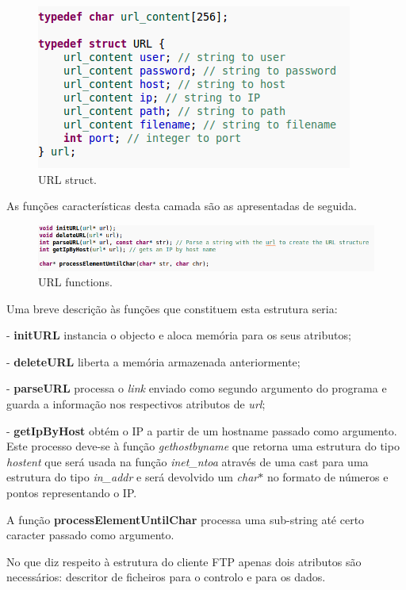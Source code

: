 \documentclass[a4paper]{article}
\begin{document}
\begin{figure}[h!]
\centering
\includegraphics[scale=0.5]{res/url-struct.png}
\caption{URL struct.}
\end{figure}

As funções características desta camada são as apresentadas de seguida.
\pagebreak

\begin{figure}[h!]
\includegraphics[scale=0.5]{res/url-functions.png}
\caption{URL functions.}
\end{figure}

Uma breve descrição às funções que constituem esta estrutura seria:

- \textbf{initURL} instancia o objecto e aloca memória para os seus atributos;

- \textbf{deleteURL} liberta a memória armazenada anteriormente;

- \textbf{parseURL} processa o \textit{link} enviado como segundo argumento do programa e guarda a informação nos respectivos atributos de \textit{url};

- \textbf{getIpByHost} obtém o IP a partir de um hostname passado como argumento. Este processo deve-se à função \textit{gethostbyname} que retorna uma estrutura do tipo \textit{hostent} que será usada na função \textit{inet\_ntoa} através de uma cast para uma estrutura do tipo \textit{in\_addr} e será devolvido um \textit{char$*$} no formato de números e pontos representando o IP.

A função \textbf{processElementUntilChar} processa uma sub-string até certo caracter passado como argumento.\linebreak

No que diz respeito à estrutura do cliente FTP apenas dois atributos são necessários: descritor de ficheiros para o controlo e para os dados.
\end{document}
